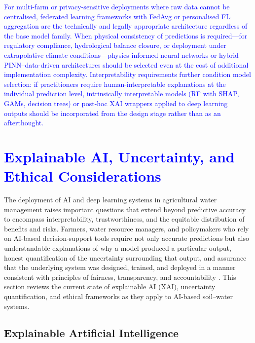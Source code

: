\documentclass[land,article,submit,pdftex,moreauthors]{Definitions/mdpi}
\numberwithin{equation}{section}
\begin{document}
\textcolor{blue}{For multi-farm or privacy-sensitive deployments where raw data cannot be centralised, federated learning frameworks with FedAvg or personalised FL aggregation are the technically and legally appropriate architecture regardless of the base model family. When physical consistency of predictions is required---for regulatory compliance, hydrological balance closure, or deployment under extrapolative climate conditions---physics-informed neural networks or hybrid PINN--data-driven architectures should be selected even at the cost of additional implementation complexity. Interpretability requirements further condition model selection: if practitioners require human-interpretable explanations at the individual prediction level, intrinsically interpretable models (RF with SHAP, GAMs, decision trees) or post-hoc XAI wrappers applied to deep learning outputs should be incorporated from the design stage rather than as an afterthought.}


\section{\textcolor{blue}{Explainable AI, Uncertainty, and Ethical Considerations}}

The deployment of AI and deep learning systems in agricultural water management raises important questions that extend beyond predictive accuracy to encompass interpretability, trustworthiness, and the equitable distribution of benefits and risks. Farmers, water resource managers, and policymakers who rely on AI-based decision-support tools require not only accurate predictions but also understandable explanations of why a model produced a particular output, honest quantification of the uncertainty surrounding that output, and assurance that the underlying system was designed, trained, and deployed in a manner consistent with principles of fairness, transparency, and accountability \citep{adadi2018peeking}. This section reviews the current state of explainable AI (XAI), uncertainty quantification, and ethical frameworks as they apply to AI-based soil--water systems.

\subsection{Explainable Artificial Intelligence}
\end{document}
